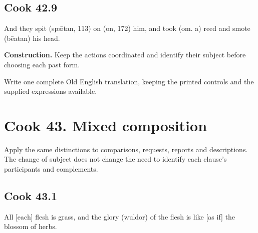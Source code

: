 \par\begin{minipage}{\linewidth}\raggedright
\subsection*{Cook 42.9}

And they spit (spǣtan, 113) on (on, 172) him, and took (om. a) reed and smote (bēatan) his head.

\textbf{Construction.} Keep the actions coordinated and identify their subject before choosing each past form.

Write one complete Old English translation, keeping the printed controls and the supplied expressions available.

\end{minipage}\par\addvspace{4pt}

\section*{Cook 43. Mixed composition}

Apply the same distinctions to comparisons, requests, reports and descriptions. The change of subject does not change the need to identify each clause’s participants and complements.

\par\begin{minipage}{\linewidth}\raggedright
\subsection*{Cook 43.1}

All [each] flesh is grass, and the glory (wuldor) of the flesh is like [as if] the blossom of herbs.

\end{minipage}\par\addvspace{4pt}

